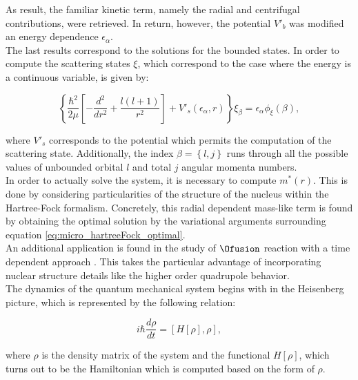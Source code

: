 \documentclass[openany]{book}
\begin{document}
As result, the familiar kinetic term, namely the radial and centrifugal contributions, were retrieved. In return, however, the potential $V'_b$ was modified an energy dependence $\epsilon_\alpha$. \\

The last results correspond to the solutions for the bounded states. In order to compute the scattering states $\xi$, which correspond to the case where the energy is a continuous variable, is given by: 

\begin{equation}\label{eq:micro_hartreeFock_implementation_schrodinger_scattered}
	\left \{ \frac{\hbar^2}{2\mu} \left [ - \frac{d^2}{dr^2} + \frac{l(l+1)}{r^2} \right] + V'_s(\epsilon_\alpha, r) \right \} \xi_\beta = \epsilon_\alpha \phi_\xi(\beta),
\end{equation}

where $V'_s$ corresponds to the potential which permits the computation of the scattering state. Additionally, the index $\beta = \left \{ l, j\right \}$ runs through all the possible values of unbounded orbital $l$ and total $j$ angular momenta numbers. \\

In order to actually solve the system, it is necessary to compute $m^{*}(r)$. This is done by considering particularities of the structure of the nucleus within the Hartree-Fock formalism. Concretely, this radial dependent mass-like term is found by obtaining the optimal solution by the variational arguments surrounding equation \ref{eq:micro_hartreeFock_optimal}. \\

An additional application is found in the study of $\Ofusion$ reaction with a time dependent approach \cite{simenel_keser_umar_oberacker_2013}. This takes the particular advantage of incorporating nuclear structure details like the higher order quadrupole behavior. \\

The dynamics of the quantum mechanical system begins with in the Heisenberg picture, which is represented by the following relation:  

\begin{equation}\label{micro_TDHF_evolution}
	i\hbar \frac{d\rho}{dt} = [H[\rho], \rho],
\end{equation}

where $\rho$ is the density matrix of the system and the functional $H[\rho]$, which turns out to be the Hamiltonian which is computed based on the form of $\rho$. \\
\end{document}
